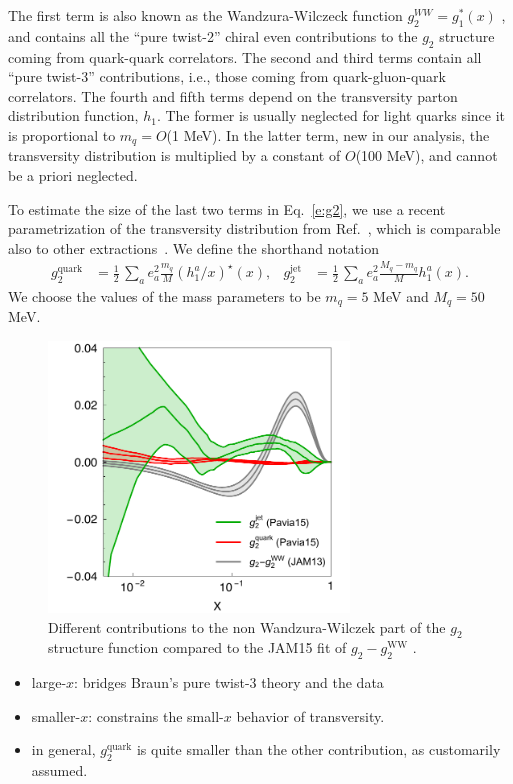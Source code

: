 \documentclass[preprintnumbers,floatfix,nofootinbib]{revtex4}
\newcommand{\mj}{M_q}
\begin{document}
The first term is also known as the Wandzura-Wilczeck function $g_2^{WW} =
g_1^*(x)$ , and contains all the ``pure twist-2'' chiral even contributions to
the $g_2$ structure coming from quark-quark correlators. The second and third
terms contain all ``pure twist-3'' contributions, i.e., those coming from
quark-gluon-quark correlators. The fourth and fifth terms depend on the
transversity parton distribution function, $h_1$. 
The former is usually neglected for
light quarks since it is proportional to $m_q=O$(1 MeV). In the latter term,
new in our analysis, the transversity distribution is multiplied by a constant
of $O$(100 MeV), and cannot be a priori neglected.

To estimate the size of the last two terms in Eq.~\eqref{e:g2}, 
we use a recent parametrization of the transversity distribution from
Ref.~\cite{Radici:2015mwa}, which is comparable also to other
extractions~\cite{Anselmino:2013vqa,Kang:2015msa}. We define the shorthand
notation
\begin{align}
g_2^{\text{quark}} &= \frac{1}{2}\,\sum_a e_a^2 
 \frac{m_q}{M} (h_1^a/x)^\star(x),
&
g_2^{\text{jet}} &= \frac{1}{2}\,\sum_a e_a^2 
\frac{\mj-m_q}{M} h_1^a(x). 
\end{align} 
We choose the values of the mass parameters to be $m_q=5$ MeV and 
$\mj = 50$ MeV.

\begin{figure}[ht]
\begin{center}
\includegraphics[width=8cm]{g2contrib}
\caption{\label{f:g2contrib} 
Different contributions to the non Wandzura-Wilczek part of the $g_2$ structure function compared to the JAM15 fit of $g_2-g_2^{\text{WW}}$ \cite{JAM15}.
}
\end{center}
\end{figure}

\begin{itemize}
\item large-$x$: bridges Braun's pure twist-3 theory and the data
\item smaller-$x$: constrains the small-$x$ behavior of transversity.
\item in general, $g_2^{\text{quark}}$ is quite smaller than the other contribution, as customarily assumed.
\end{itemize}
\end{document}
